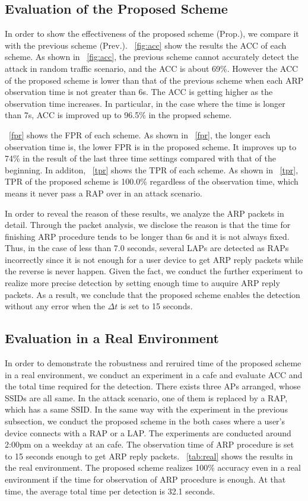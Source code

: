 \documentclass[conference]{IEEEtran}
\begin{document}
\subsection{Evaluation of the Proposed Scheme}
In order to show the effectiveness of the proposed scheme (Prop.), we compare it with the previous scheme \cite{previous} (Prev.).
\figurename~\ref{fig:acc} show the results the ACC of each scheme.
As shown in \figurename~\ref{fig:acc}, the previous scheme cannot accurately detect the attack in random traffic scenario, and the ACC is about 69\%.
However the ACC of the proposed scheme is lower than that of the previous scheme when each ARP observation time is not greater than 6s.
The ACC is getting higher as the observation time increases.
In particular, in the case where the time is longer than 7s, ACC is improved up to 96.5\% in the propsed scheme.

\figurename~\ref{fpr} shows the FPR of each scheme.
As shown in \figurename~\ref{fpr}, the longer each observation time is, the lower FPR is in the proposed scheme.
It improves up to 74\% in the result of the last three time settings compared with that of the beginning.
In additon, \figurename~\ref{tpr} shows the TPR of each scheme.
As shown in \figurename~\ref{tpr}, TPR of the proposed scheme is 100.0\% regardless of the observation time, which means it never pass a RAP over in an attack scenario.

In order to reveal the reason of these results, we analyze the ARP packets in detail.
Through the packet analysis, we disclose the reason is that the time for finishing ARP procedure tends to be longer than 6s and it is not always fixed.
Thus, in the case of less than 7.0 seconds, several LAPs are detected as RAPs incorrectly since it is not enough for a user device to get ARP reply packets while the reverse is never happen.
Given the fact, we conduct the further experiment to realize more precise detection by setting enough time to auquire ARP reply packets.
As a result, we conclude that the proposed scheme enables the detection without any error when the $\Delta t$ is set to 15 seconds.

\subsection{Evaluation in a Real Environment}
In order to demonstrate the robustness and reruired time of the proposed scheme in a real environment, we conduct an experiment in a cafe and evaluate ACC and the total time required for the detection.
There exists three APs arranged, whose SSIDs are all same.
In the attack scenario, one of them is replaced by a RAP, which has a same SSID.
In the same way with the experiment in the previous subsection, we conduct the proposed scheme in the both cases where a user's device connects with a RAP or a LAP.
The experiments are conducted around 2:00pm on a weekday at an cafe.
The observation time of ARP procedure is set to 15 seconds enough to get ARP reply packets.
\tablename~\ref{tab:real} shows the results in the real environment.
The proposed scheme realizes 100\% accuracy even in a real environment if the time for observation of ARP procedure is enough.
At that time, the average total time per detection is 32.1 seconds.
\end{document}
